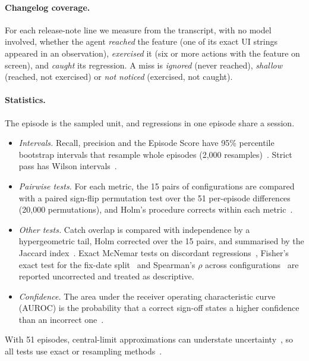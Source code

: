 \documentclass[sigconf]{acmart}
\begin{document}
\paragraph{Changelog coverage.}
For each release-note line we measure from the transcript, with no model involved, whether the agent
\emph{reached} the feature (one of its exact UI strings appeared in an observation), \emph{exercised}
it (six or more actions with the feature on screen), and \emph{caught} its regression. A miss is
\emph{ignored} (never reached), \emph{shallow} (reached, not exercised) or \emph{not noticed}
(exercised, not caught).

\paragraph{Statistics.}
The episode is the sampled unit, and regressions in one episode share a session.
\begin{itemize}[leftmargin=*]
\item \emph{Intervals.} Recall, precision and the Episode Score have 95\% percentile bootstrap
  intervals that resample whole episodes (2,000 resamples)~\cite{efron1979,field2007clustered}. Strict
  pass has Wilson intervals~\cite{wilson1927,brown2001interval}.
\item \emph{Pairwise tests.} For each metric, the 15 pairs of configurations are compared with a paired
  sign-flip permutation test over the 51 per-episode differences (20,000 permutations), and Holm's
  procedure corrects within each metric~\cite{holm1979}.
\item \emph{Other tests.} Catch overlap is compared with independence by a hypergeometric tail, Holm
  corrected over the 15 pairs, and summarised by the Jaccard index~\cite{jaccard1912}. Exact McNemar
  tests on discordant regressions~\cite{mcnemar1947}, Fisher's exact test for the fix-date
  split~\cite{fisher1922} and Spearman's $\rho$ across configurations~\cite{spearman1904} are
  reported uncorrected and treated as descriptive.
\item \emph{Confidence.} The area under the receiver operating characteristic curve (AUROC) is the
  probability that a correct sign-off states a higher confidence than an incorrect
  one~\cite{hanley1982auc}.
\end{itemize}
With 51 episodes, central-limit approximations can understate uncertainty~\cite{bowyer2025clt}, so
all tests use exact or resampling methods~\cite{miller2024errorbars}.

\end{document}
